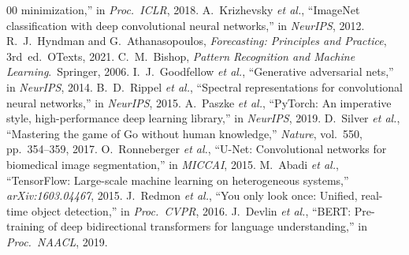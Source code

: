 \documentclass[conference]{IEEEtran}
\begin{document}
\begin{thebibliography}{00}
  minimization,'' in \textit{Proc.\ ICLR}, 2018.
 A.~Krizhevsky \textit{et al.}, ``ImageNet classification with
  deep convolutional neural networks,'' in \textit{NeurIPS}, 2012.
 R.~J.~Hyndman and G.~Athanasopoulos, \textit{Forecasting:
  Principles and Practice}, 3rd~ed.\ OTexts, 2021.
 C.~M.~Bishop, \textit{Pattern Recognition and Machine
  Learning}.\ Springer, 2006.
 I.~J.~Goodfellow \textit{et al.}, ``Generative adversarial
  nets,'' in \textit{NeurIPS}, 2014.
 B.~D.~Rippel \textit{et al.}, ``Spectral representations for
  convolutional neural networks,'' in \textit{NeurIPS}, 2015.
 A.~Paszke \textit{et al.}, ``PyTorch: An imperative style,
  high-performance deep learning library,'' in \textit{NeurIPS}, 2019.
 D.~Silver \textit{et al.}, ``Mastering the game of Go without
  human knowledge,'' \textit{Nature}, vol.~550, pp.~354--359, 2017.
 O.~Ronneberger \textit{et al.}, ``U-Net: Convolutional networks
  for biomedical image segmentation,'' in \textit{MICCAI}, 2015.
 M.~Abadi \textit{et al.}, ``TensorFlow: Large-scale machine
  learning on heterogeneous systems,'' \textit{arXiv:1603.04467}, 2015.
 J.~Redmon \textit{et al.}, ``You only look once: Unified,
  real-time object detection,'' in \textit{Proc.\ CVPR}, 2016.
 J.~Devlin \textit{et al.}, ``BERT: Pre-training of deep
  bidirectional transformers for language understanding,''
  in \textit{Proc.\ NAACL}, 2019.
\end{thebibliography}
\end{document}
